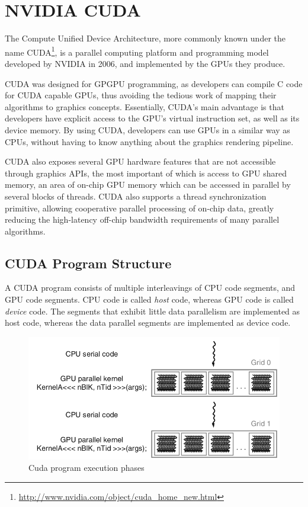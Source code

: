 \documentclass[12pt, a4paper]{report}
\begin{document}
\begin{sloppypar}
\chapter{NVIDIA CUDA}
The Compute Unified Device Architecture, more commonly known under the name
CUDA\footnote{\url{http://www.nvidia.com/object/cuda_home_new.html}}, is a parallel computing platform and programming model developed by
NVIDIA in 2006, and implemented by the GPUs they produce.

CUDA was designed for GPGPU programming, as developers can compile C code for
CUDA capable GPUs, thus avoiding the tedious work of mapping their algorithms to
graphics concepts.
Essentially, CUDA's main advantage is that developers have explicit access to
the GPU's virtual instruction set, as well as its device memory.
By using CUDA, developers can use GPUs in a similar way as CPUs, without having
to know anything about the graphics rendering pipeline.

CUDA also exposes several GPU hardware features that are not accessible through
graphics APIs, the most important of which is access to GPU shared memory, an
area of on-chip GPU memory which can be accessed in parallel by several blocks
of threads.
CUDA also supports a thread synchronization primitive, allowing cooperative
parallel processing of on-chip data, greatly reducing the high-latency off-chip
bandwidth requirements of many parallel algorithms.

\section{CUDA Program Structure}
A CUDA program consists of multiple interleavings of CPU code segments,
and GPU code segments.
CPU code is called \emph{host} code, whereas GPU code is called \emph{device}
code.
The segments that exhibit little data parallelism are implemented as host code,
whereas the data parallel segments are implemented as device code.

\begin{figure}[h]
\centering
\includegraphics[scale=0.35]{figs/cuda_program_execution_phases}
\caption{Cuda program execution phases}
\label{fig:cuda_program_execution_phases}
\end{figure}


\end{sloppypar}
\end{document}
